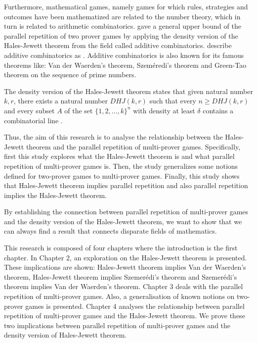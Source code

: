 Furthermore, mathematical games, namely games for which rules, strategies and outcomes have been mathematized are related to the number theory,
which in turn is related to  arithmetic combinatorics.
\cite{verbitsky1996towards} gave a general  upper bound of the parallel repetition of  two prover games by applying the density version of the Hales-Jewett theorem from the field called additive combinatorics. \cite*{taoadditive} describe
additive combinatorics  as  . Additive combinatorics is also known for its famous theorems like: Van der Waerden's theorem, Szeméredi's theorem and Green-Tao theorem on the sequence of prime numbers.


The density version of the Hales-Jewett theorem states that given natural number $k,r$, there exists a natural number $DHJ(k,r)$ such that every $n\geq DHJ(k,r)$ and every subset $A$ of the set $\{1,2,\ldots,k\}^n$ with density at least $\delta$  contains a  combinatorial line  \citep{polymath2012new}.

Thus, the aim of this research is to analyse the relationship between the Hales-Jewett theorem and the parallel repetition of multi-prover games. Specifically, first  this study explores what  the Hales-Jewett theorem is and what  parallel repetition of multi-prover games is. Then, the study  generalizes some notions defined for two-prover games to multi-prover games.  Finally, this study shows that Hales-Jewett theorem implies parallel repetition and also parallel repetition implies the Hales-Jewett theorem.



By establishing the connection between parallel repetition of multi-prover games and the density version of the Hales-Jewett theorem, we want to show that we can always find a result that connects disparate fields of mathematics.

This research is composed of four chapters where the introduction is the first chapter. In Chapter 2, an exploration on the Hales-Jewett theorem is presented. These implications are shown:  Hales-Jewett theorem implies Van der Waerden's theorem, Hales-Jewett theorem implies Szemerédi's theorem and Szemerédi's theorem implies Van der Waerden's theorem. Chapter 3 deals with the parallel repetition of  multi-prover games. Also, a generalisation of  known notions on two-prover games is presented. Chapter 4 analyses the relationship between parallel repetition of multi-prover games and the Hales-Jewett theorem.  We prove these two implications between  parallel repetition of multi-prover games and the density version of Hales-Jewett theorem. 



%
%





